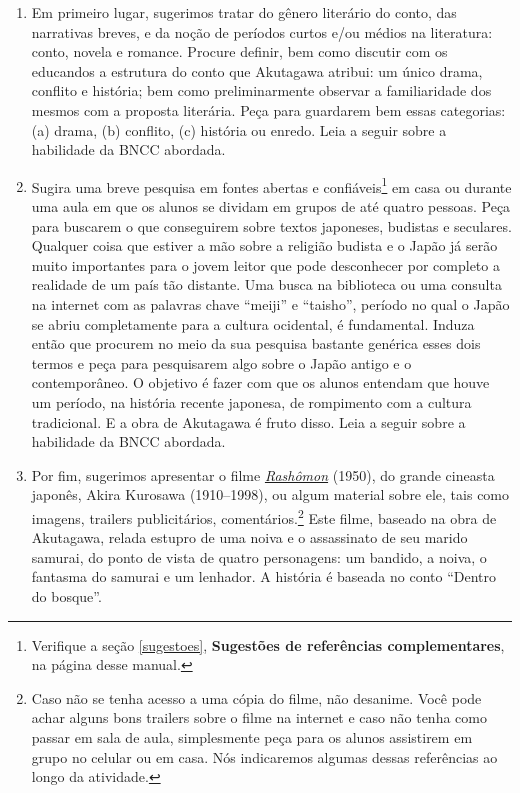 \documentclass[12pt]{extarticle}
\begin{document}
\begin{enumerate} 
\item Em primeiro lugar, sugerimos tratar do gênero literário
do conto,  das narrativas breves, e da noção de períodos curtos e/ou
médios na literatura: conto, novela e romance. Procure definir, bem como
discutir com os educandos a estrutura do conto que Akutagawa atribui: um
único drama, conflito e história; bem como preliminarmente observar a
familiaridade dos mesmos com a proposta literária. Peça para guardarem
bem essas categorias: (a) drama, (b) conflito, (c) história ou enredo.
Leia a seguir sobre a habilidade da BNCC abordada.


\item Sugira uma breve pesquisa em fontes abertas e confiáveis\footnote{Verifique 
a seção \ref{sugestoes}, \textbf{Sugestões de referências complementares}, 
na página \pageref{sugestoes} desse manual.} 
em casa ou durante uma aula em que os alunos se
dividam em grupos de até quatro pessoas. 
Peça para buscarem o que conseguirem
sobre textos japoneses, budistas e seculares.
Qualquer coisa que estiver a
mão sobre a religião budista e o Japão já serão muito importantes para o
jovem leitor que pode desconhecer por completo a realidade de um país tão
distante. Uma busca na biblioteca ou uma consulta na internet com as
palavras chave ``meiji'' e ``taisho'', período no qual o Japão se abriu
completamente para a cultura ocidental, é fundamental. Induza então que
procurem no meio da sua pesquisa bastante genérica esses dois termos e peça
para pesquisarem algo sobre o Japão antigo e o contemporâneo. O objetivo é
fazer com que os alunos entendam que houve um período, na história recente
japonesa, de rompimento com a cultura tradicional. E a obra de Akutagawa é
fruto disso. Leia a seguir sobre a habilidade da BNCC abordada.

\item Por fim, sugerimos apresentar o filme
\href{https://www.youtube.com/watch?v=xCZ9TguVOIA}{\textit{Rashômon}} (1950),
do grande cineasta japonês, Akira Kurosawa (1910--1998), ou algum material
sobre ele, tais como imagens, trailers publicitários,
comentários.\footnote{Caso não se tenha acesso a uma cópia do filme, não
desanime. Você pode achar alguns bons trailers sobre o filme na internet e
caso não tenha como passar em sala de aula, simplesmente peça para os
alunos assistirem em grupo no celular ou em casa.  Nós indicaremos algumas
dessas referências ao longo da atividade.} Este filme, baseado na obra de
Akutagawa, relada estupro de uma noiva e o assassinato de seu marido
samurai, do ponto de vista de quatro personagens: um bandido, a noiva, o
fantasma do samurai e um lenhador.  A história é baseada no conto ``Dentro do
bosque''.  

\end{enumerate}
\end{document}
